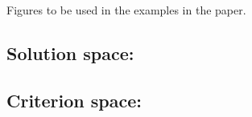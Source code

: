 \documentclass{article}
\begin{document}
Figures to be used in the examples in the paper. 

\subsection*{Solution space:}
\resizebox{\linewidth}{!}{}

\subsection*{Criterion space:}
\resizebox{\linewidth}{!}{}
\end{document}
